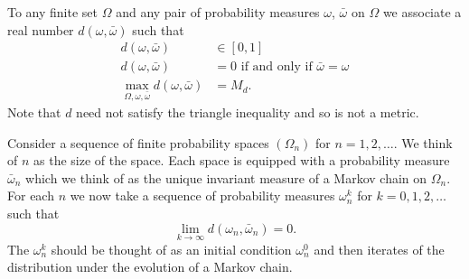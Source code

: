 
To any finite set $\Omega$ and any pair of probability measures
$\omega$, $\bar{\omega}$ on $\Omega$ we associate a real number
$d(\omega,\bar{\omega})$ such that
\begin{subequations}
\label{eqn:defn_d}
\begin{align}
d(\omega,\bar{\omega}) &\in [0,1] \\
d(\omega,\bar{\omega}) &= 0 \text{ if and only if } \bar{\omega}=\omega \\
\max_{\Omega,\omega,\bar{\omega}} d(\omega,\bar{\omega}) &= M_d.
\end{align}
\end{subequations}
Note that $d$ need not satisfy the triangle inequality and so is not a
metric.




Consider a sequence of finite probability spaces $(\Omega_n)$ for $n =
1,2,\ldots$. We think of $n$ as the size of the space. Each space is
equipped with a probability measure $\bar{\omega}_n$ which we think of
as the unique invariant measure of a Markov chain on $\Omega_n$. For
each $n$ we now take a sequence of probability measures $\omega_n^k$
for $k = 0,1,2,\ldots$ such that
\begin{equation}
\lim_{k \rightarrow \infty} d(\omega_n,\bar{\omega}_n)=0.
\end{equation}
The $\omega_n^k$ should be thought of as an initial condition
$\omega_n^0$ and then iterates of the distribution under the
evolution of a Markov chain.



